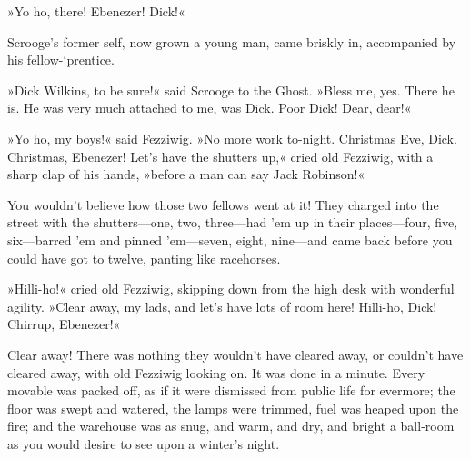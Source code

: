 »Yo ho, there! Ebenezer! Dick!«

Scrooge's former self, now grown a young man, came briskly in, accompanied by his fellow-`prentice.

»Dick Wilkins, to be sure!« said Scrooge to the Ghost. »Bless me, yes. There he is. He was very much attached to me, was Dick. Poor Dick! Dear, dear!«

»Yo ho, my boys!« said Fezziwig. »No more work to-night. Christmas Eve, Dick. Christmas, Ebenezer! Let's have the shutters up,« cried old Fezziwig, with a sharp clap of his hands, »before a man can say Jack Robinson!«

You wouldn't believe how those two fellows went at it! They charged into the street with the shutters—one, two, three—had 'em up in their places—four, five, six—barred 'em and pinned 'em—seven, eight, nine—and came back before you could have got to twelve, panting like racehorses.

»Hilli-ho!« cried old Fezziwig, skipping down from the high desk with wonderful agility. »Clear away, my lads, and let's have lots of room here! Hilli-ho, Dick! Chirrup, Ebenezer!«

Clear away! There was nothing they wouldn't have cleared away, or couldn't have cleared away, with old Fezziwig looking on. It was done in a minute. Every movable was packed off, as if it were dismissed from public life for evermore; the floor was swept and watered, the lamps were trimmed, fuel was heaped upon the fire; and the warehouse was as snug, and warm, and dry, and bright a ball-room as you would desire to see upon a winter's night.

